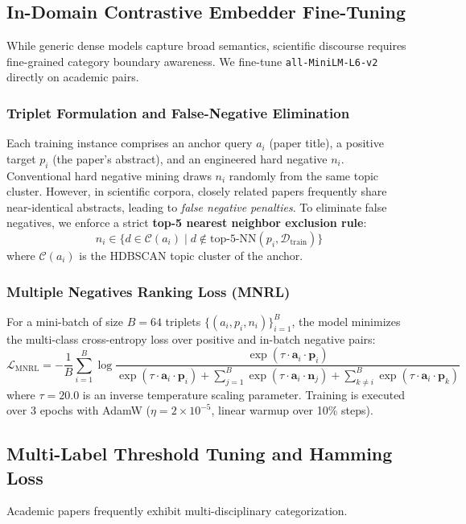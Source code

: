 \documentclass[journal]{IEEEtran}
\begin{document}
\subsection{In-Domain Contrastive Embedder Fine-Tuning}
While generic dense models capture broad semantics, scientific discourse requires fine-grained category boundary awareness. We fine-tune \texttt{all-MiniLM-L6-v2} directly on academic pairs.

\subsubsection{Triplet Formulation and False-Negative Elimination}
Each training instance comprises an anchor query $a_i$ (paper title), a positive target $p_i$ (the paper's abstract), and an engineered hard negative $n_i$. Conventional hard negative mining draws $n_i$ randomly from the same topic cluster. However, in scientific corpora, closely related papers frequently share near-identical abstracts, leading to \textit{false negative penalties}.
To eliminate false negatives, we enforce a strict \textbf{top-5 nearest neighbor exclusion rule}:
\begin{equation}
n_i \in \{d \in \mathcal{C}(a_i) \mid d \notin \text{top-5-NN}(p_i, \mathcal{D}_{\text{train}})\}
\end{equation}
where $\mathcal{C}(a_i)$ is the HDBSCAN topic cluster of the anchor.

\subsubsection{Multiple Negatives Ranking Loss (MNRL)}
For a mini-batch of size $B = 64$ triplets $\{(a_i, p_i, n_i)\}_{i=1}^B$, the model minimizes the multi-class cross-entropy loss over positive and in-batch negative pairs:
\begin{equation}
\mathcal{L}_{\text{MNRL}} = -\frac{1}{B} \sum_{i=1}^B \log \frac{\exp(\tau \cdot \mathbf{a}_i \cdot \mathbf{p}_i)}{\exp(\tau \cdot \mathbf{a}_i \cdot \mathbf{p}_i) + \sum_{j=1}^B \exp(\tau \cdot \mathbf{a}_i \cdot \mathbf{n}_j) + \sum_{k \ne i}^B \exp(\tau \cdot \mathbf{a}_i \cdot \mathbf{p}_k)}
\end{equation}
where $\tau = 20.0$ is an inverse temperature scaling parameter. Training is executed over 3 epochs with AdamW ($\eta = 2 \times 10^{-5}$, linear warmup over 10\% steps).

\subsection{Multi-Label Threshold Tuning and Hamming Loss}
Academic papers frequently exhibit multi-disciplinary categorization.
\end{document}
